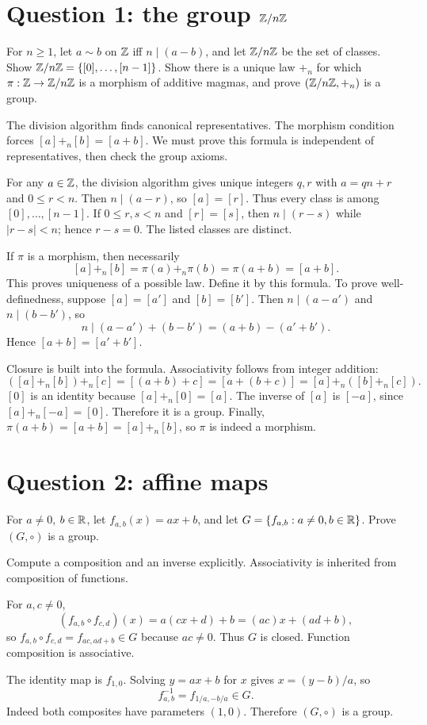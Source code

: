 \documentclass[11pt,openany]{book}
\begin{document}
\section{Question 1: the group $\mathbb Z/n\mathbb Z$}
\begin{questionbox}
For $n\ge1$, let $a\sim b$ on $\mathbb Z$ iff $n\mid(a-b)$, and let $\mathbb Z/n\mathbb Z$ be the set of classes. Show
$\mathbb Z/n\mathbb Z=\{[0],\ldots,[n-1]\}$. Show there is a unique law $+_n$ for which $\pi:\mathbb Z\to\mathbb Z/n\mathbb Z$ is a morphism of additive magmas, and prove $(\mathbb Z/n\mathbb Z,+_n)$ is a group.
\end{questionbox}
\begin{approachbox}
The division algorithm finds canonical representatives. The morphism condition forces $[a]+_n[b]=[a+b]$. We must prove this formula is independent of representatives, then check the group axioms.
\end{approachbox}
\begin{solutionbox}
For any $a\in\mathbb Z$, the division algorithm gives unique integers $q,r$ with
$a=qn+r$ and $0\le r<n$. Then $n\mid(a-r)$, so $[a]=[r]$. Thus every class is among $[0],\ldots,[n-1]$. If $0\le r,s<n$ and $[r]=[s]$, then $n\mid(r-s)$ while $|r-s|<n$; hence $r-s=0$. The listed classes are distinct.

If $\pi$ is a morphism, then necessarily
\[
[a]+_n[b]=\pi(a)+_n\pi(b)=\pi(a+b)=[a+b].
\]
This proves uniqueness of a possible law. Define it by this formula. To prove well-definedness, suppose $[a]=[a']$ and $[b]=[b']$. Then $n\mid(a-a')$ and $n\mid(b-b')$, so
\[
n\mid (a-a')+(b-b')=(a+b)-(a'+b').
\]
Hence $[a+b]=[a'+b']$.

Closure is built into the formula. Associativity follows from integer addition:
\[
([a]+_n[b])+_n[c]=[(a+b)+c]=[a+(b+c)]=[a]+_n([b]+_n[c]).
\]
$[0]$ is an identity because $[a]+_n[0]=[a]$. The inverse of $[a]$ is $[-a]$, since $[a]+_n[-a]=[0]$. Therefore it is a group. Finally,
$\pi(a+b)=[a+b]=[a]+_n[b]$, so $\pi$ is indeed a morphism.
\end{solutionbox}

\section{Question 2: affine maps}
\begin{questionbox}
For $a\ne0$, $b\in\mathbb R$, let $f_{a,b}(x)=ax+b$, and let $G=\{f_{a,b}:a\ne0,b\in\mathbb R\}$. Prove $(G,\circ)$ is a group.
\end{questionbox}
\begin{approachbox}
Compute a composition and an inverse explicitly. Associativity is inherited from composition of functions.
\end{approachbox}
\begin{solutionbox}
For $a,c\ne0$,
\[
(f_{a,b}\circ f_{c,d})(x)=a(cx+d)+b=(ac)x+(ad+b),
\]
so $f_{a,b}\circ f_{c,d}=f_{ac,ad+b}\in G$ because $ac\ne0$. Thus $G$ is closed. Function composition is associative.

The identity map is $f_{1,0}$. Solving $y=ax+b$ for $x$ gives $x=(y-b)/a$, so
\[
f_{a,b}^{-1}=f_{1/a,-b/a}\in G.
\]
Indeed both composites have parameters $(1,0)$. Therefore $(G,\circ)$ is a group.
\end{solutionbox}
\end{document}
